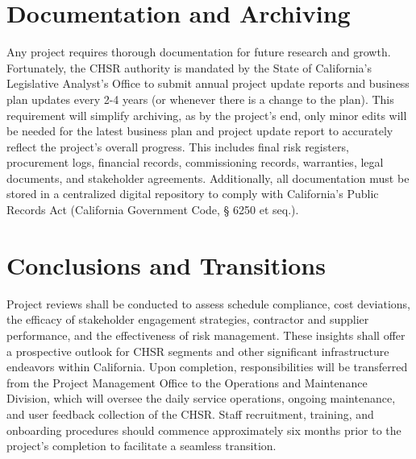 \section{Documentation and Archiving}
Any project requires thorough documentation for future research and growth. Fortunately, the CHSR authority is mandated by the State of California’s Legislative Analyst’s Office to submit annual project update reports and business plan updates every 2-4 years (or whenever there is a change to the plan). This requirement will simplify archiving, as by the project’s end, only minor edits will be needed for the latest business plan and project update report to accurately reflect the project’s overall progress. This includes final risk registers, procurement logs, financial records, commissioning records, warranties, legal documents, and stakeholder agreements. Additionally, all documentation must be stored in a centralized digital repository to comply with California’s Public Records Act (California Government Code, § 6250 et seq.).

\section{Conclusions and Transitions}
Project reviews shall be conducted to assess schedule compliance, cost deviations, the efficacy of stakeholder engagement strategies, contractor and supplier performance, and the effectiveness of risk management. These insights shall offer a prospective outlook for CHSR segments and other significant infrastructure endeavors within California. Upon completion, responsibilities will be transferred from the Project Management Office to the Operations and Maintenance Division, which will oversee the daily service operations, ongoing maintenance, and user feedback collection of the CHSR. Staff recruitment, training, and onboarding procedures should commence approximately six months prior to the project’s completion to facilitate a seamless transition. \par
\clearpage